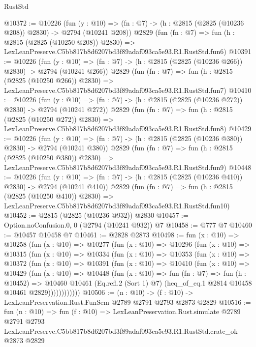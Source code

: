 \begin{lexlean}{RustStd}
\begin{coremodule}
@10372 := @10226
    (fun (y : @10) => (fn : @7) -> (h : @2815 (@2825 (@10236 @208)) @2830) -> @2794 (@10241 @208))
    @2829
    (fun (fn : @7) =>
    fun (h : @2815 (@2825 (@10250 @208)) @2830) =>
    LexLeanPreserve.C5bb817b8d6207bd3f89adaf093ca5e93.R1.RustStd.fun6)
@10391 := @10226
    (fun (y : @10) => (fn : @7) -> (h : @2815 (@2825 (@10236 @266)) @2830) -> @2794 (@10241 @266))
    @2829
    (fun (fn : @7) =>
    fun (h : @2815 (@2825 (@10250 @266)) @2830) =>
    LexLeanPreserve.C5bb817b8d6207bd3f89adaf093ca5e93.R1.RustStd.fun7)
@10410 := @10226
    (fun (y : @10) => (fn : @7) -> (h : @2815 (@2825 (@10236 @272)) @2830) -> @2794 (@10241 @272))
    @2829
    (fun (fn : @7) =>
    fun (h : @2815 (@2825 (@10250 @272)) @2830) =>
    LexLeanPreserve.C5bb817b8d6207bd3f89adaf093ca5e93.R1.RustStd.fun8)
@10429 := @10226
    (fun (y : @10) => (fn : @7) -> (h : @2815 (@2825 (@10236 @380)) @2830) -> @2794 (@10241 @380))
    @2829
    (fun (fn : @7) =>
    fun (h : @2815 (@2825 (@10250 @380)) @2830) =>
    LexLeanPreserve.C5bb817b8d6207bd3f89adaf093ca5e93.R1.RustStd.fun9)
@10448 := @10226
    (fun (y : @10) => (fn : @7) -> (h : @2815 (@2825 (@10236 @410)) @2830) -> @2794 (@10241 @410))
    @2829
    (fun (fn : @7) =>
    fun (h : @2815 (@2825 (@10250 @410)) @2830) =>
    LexLeanPreserve.C5bb817b8d6207bd3f89adaf093ca5e93.R1.RustStd.fun10)
@10452 := @2815 (@2825 (@10236 @932)) @2830
@10457 := Option.noConfusion.{0, 0} (@2794 (@10241 @932)) @7
@10458 := @777 @7
@10460 := @10457 @10458 @7
@10461 := @2828 @2873
@10498 := fun (x : @10) =>
  @10258
    (fun (x : @10) =>
    @10277
      (fun (x : @10) =>
      @10296
        (fun (x : @10) =>
        @10315
          (fun (x : @10) =>
          @10334
            (fun (x : @10) =>
            @10353
              (fun (x : @10) =>
              @10372
                (fun (x : @10) =>
                @10391
                  (fun (x : @10) =>
                  @10410
                    (fun (x : @10) =>
                    @10429
                      (fun (x : @10) =>
                      @10448
                        (fun (x : @10) =>
                        fun (fn : @7) =>
                        fun (h : @10452) =>
                        @10460
                          @10461
                          (Eq.refl.{2} (Sort 1) @7)
                          (heq_of_eq.{1} @2814 @10458 @10461 @2829))))))))))))
@10506 := (n : @10) -> (f : @10) -> LexLeanPreservation.Rust.FunSem @2789 @2791 @2793 @2873 @2829
@10516 := fun (n : @10) =>
  fun (f : @10) =>
  LexLeanPreservation.Rust.simulate
    @2789
    @2791
    @2793
    LexLeanPreserve.C5bb817b8d6207bd3f89adaf093ca5e93.R1.RustStd.crate_ok
    @2873
    @2829
\end{coremodule}
\end{lexlean}
